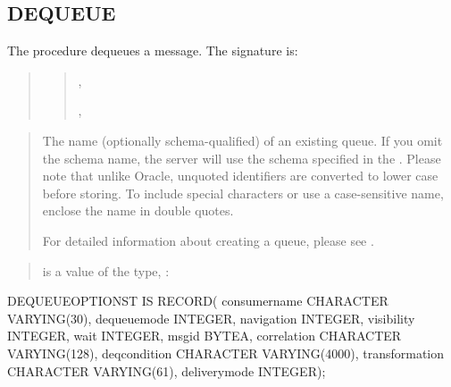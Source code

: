 \documentclass[letterpaper,10pt,english,openany,oneside]{sphinxmanual}
\begin{document}
\subsection{DEQUEUE}
\label{\detokenize{dequeue:dequeue}}\label{\detokenize{dequeue::doc}}
The  procedure dequeues a message. The signature is:
\begin{quote}

\begin{quote}

,



,

\end{quote}
\end{quote}


\begin{quote}

The name (optionally schema-qualified) of an existing queue. If you
omit the schema name, the server will use the schema specified in
the . Please note that unlike Oracle, unquoted
identifiers are converted to lower case before storing. To include
special characters or use a case-sensitive name, enclose the name in
double quotes.

For detailed information about creating a queue, please see
.
\end{quote}

\begin{quote}

 is a value of the type,
:
\end{quote}

%
\begin{sphinxVerbatim}[commandchars=\\\{\}]
DEQUEUE\PYGZus{}OPTIONS\PYGZus{}T IS RECORD(
  consumer\PYGZus{}name CHARACTER VARYING(30),
  dequeue\PYGZus{}mode INTEGER,
  navigation INTEGER,
  visibility INTEGER,
  wait INTEGER,
  msgid BYTEA,
  correlation CHARACTER VARYING(128),
  deq\PYGZus{}condition CHARACTER VARYING(4000),
  transformation CHARACTER VARYING(61),
  delivery\PYGZus{}mode INTEGER);
\end{sphinxVerbatim}
\end{document}
